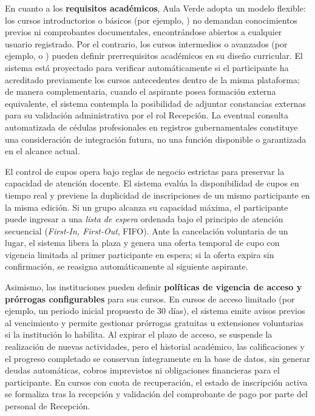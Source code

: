 En cuanto a los \textbf{requisitos académicos}, Aula Verde adopta un modelo flexible: los cursos introductorios o básicos (por ejemplo, ) no demandan conocimientos previos ni comprobantes documentales, encontrándose abiertos a cualquier usuario registrado. Por el contrario, los cursos intermedios o avanzados (por ejemplo,  o ) pueden definir prerrequisitos académicos en su diseño curricular. El sistema está proyectado para verificar automáticamente si el participante ha acreditado previamente los cursos antecedentes dentro de la misma plataforma; de manera complementaria, cuando el aspirante posea formación externa equivalente, el sistema contempla la posibilidad de adjuntar constancias externas para su validación administrativa por el rol Recepción. La eventual consulta automatizada de cédulas profesionales en registros gubernamentales constituye una consideración de integración futura, no una función disponible o garantizada en el alcance actual.

El control de cupos opera bajo reglas de negocio estrictas para preservar la capacidad de atención docente. El sistema evalúa la disponibilidad de cupos en tiempo real y previene la duplicidad de inscripciones de un mismo participante en la misma edición. Si un grupo alcanza su capacidad máxima, el participante puede ingresar a una \textit{lista de espera} ordenada bajo el principio de atención secuencial (\textit{First-In, First-Out}, FIFO). Ante la cancelación voluntaria de un lugar, el sistema libera la plaza y genera una oferta temporal de cupo con vigencia limitada al primer participante en espera; si la oferta expira sin confirmación, se reasigna automáticamente al siguiente aspirante.

Asimismo, las instituciones pueden definir \textbf{políticas de vigencia de acceso y prórrogas configurables} para sus cursos. En cursos de acceso limitado (por ejemplo, un periodo inicial propuesto de 30 días), el sistema emite avisos previos al vencimiento y permite gestionar prórrogas gratuitas u extensiones voluntarias si la institución lo habilita. Al expirar el plazo de acceso, se suspende la realización de nuevas actividades, pero el historial académico, las calificaciones y el progreso completado se conservan íntegramente en la base de datos, sin generar deudas automáticas, cobros imprevistos ni obligaciones financieras para el participante. En cursos con cuota de recuperación, el estado de inscripción activa se formaliza tras la recepción y validación del comprobante de pago por parte del personal de Recepción.

